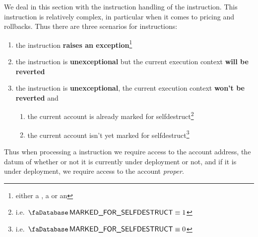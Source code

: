 We deal in this section with the instruction handling of the  instruction. 
This instruction is relatively complex, in particular when it comes to pricing and rollbacks.
Thus there are three scenarios for  instructions:
\begin{enumerate}
	\item the instruction \textbf{raises an exception}\footnote{either a \suxSH{}, a \staticxSH{} or an \oogxSH{}}
        \item the instruction is \textbf{unexceptional} but the current execution context \textbf{will be reverted}
        \item the instruction is \textbf{unexceptional}, the current execution context \textbf{won't be reverted} and
		\begin{enumerate}
			\item  the current account is already marked for selfdestruct\footnote{i.e. $\accMarkedForSelfdestruct \equiv 1$}
			\item  the current account isn't yet  marked for selfdestruct\footnote{i.e. $\accMarkedForSelfdestruct \equiv 0$}
		\end{enumerate}
\end{enumerate}
Thus when processing a  instruction we require access to the account address, the datum of whether or not it is currently under deployment or not, and if it is under deployment, we require access to the account \emph{proper}.
